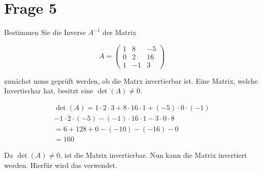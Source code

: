 \section{Frage 5}

Bestimmen Sie die Inverse $A^{-1}$ der Matrix

\[
    A = \begin{pmatrix}
        1 & 8 & -5 \\
        0 & 2 & 16 \\
        1 & -1 & 3
    \end{pmatrix}
\]

zunächst muss geprüft werden, ob die Matrx invertierbar ist. Eine Matrix, welche Invertierhar hat, besitzt eine $\det(A) \neq 0$.

\begin{align*}
    \det(A) = 1 \cdot 2 \cdot 3 + 8 \cdot 16 \cdot 1 + (-5) \cdot 0 \cdot (-1) \\
    - 1 \cdot 2 \cdot (-5) - (-1) \cdot 16 \cdot 1 - 3 \cdot 0 \cdot 8 \\
    = 6 + 128 + 0 - (-10) - (-16) - 0 \\
    = 160
\end{align*}

Da $\det(A) \neq 0$, ist die Matrix invertierbar. Nun kann die Matrix invertiert werden. Hierfür wird das  verwendet.


